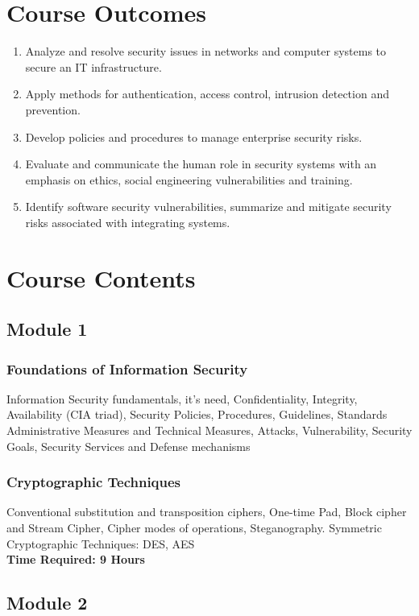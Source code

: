\documentclass[openany]{book}
\begin{document}
\chapter{Course Outcomes}
\begin{enumerate}
	\item Analyze and resolve security issues in networks and computer systems to secure an IT
	      infrastructure.
	\item Apply methods for authentication, access control, intrusion detection and prevention.
	\item Develop policies and procedures to manage enterprise security risks.
	\item Evaluate and communicate the human role in security systems with an emphasis on ethics,
	      social engineering vulnerabilities and training.
	\item Identify software security vulnerabilities, summarize and mitigate security risks associated
	      with integrating systems.
\end{enumerate}

\chapter{Course Contents}
\section{Module 1}

\subsection{Foundations of Information Security}
Information Security fundamentals, it's need,
Confidentiality, Integrity, Availability (CIA triad), Security Policies, Procedures, Guidelines,
Standards Administrative Measures and Technical Measures, Attacks, Vulnerability, Security
Goals, Security Services and Defense mechanisms

\subsection{Cryptographic Techniques}
Conventional substitution and transposition ciphers, One-time Pad, Block cipher and Stream
Cipher, Cipher modes of operations, Steganography. Symmetric Cryptographic Techniques: DES,
AES\\

\noindent
\textbf{Time Required: 9 Hours}


\section{Module 2}
\end{document}
